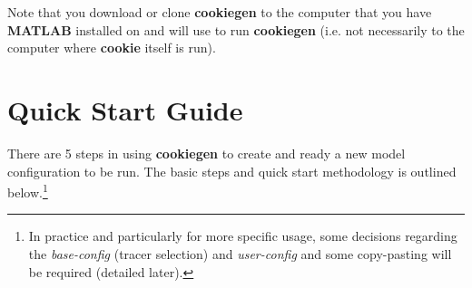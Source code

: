 \noindent Note that you download or clone \textbf{cookiegen} to the computer that you have \textbf{MATLAB} installed on and will use to run \textbf{cookiegen} (i.e. not necessarily to the computer where \textbf{cookie} itself is run).

\newpage

\section{Quick Start Guide}


There are 5 steps in using \textbf{cookiegen} to create and ready a new model configuration to be run. The basic steps and quick start methodology is outlined below.\footnote{In practice and particularly for more specific usage, some decisions regarding the \textit{base-config} (tracer selection) and \textit{user-config} and some copy-pasting will be required (detailed later).}

